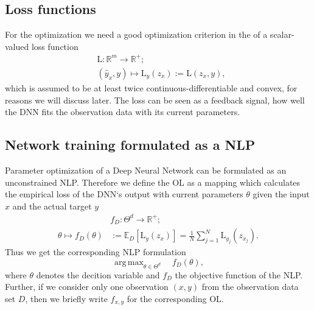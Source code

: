 \documentclass[conference]{IEEEtran}
\DeclareMathOperator*{\argmax}{arg\,max}
\begin{document}
\subsection{Loss functions}
For the optimization we need a good optimization criterion in the of a scalar-valued loss function
\begin{align*}
&\mathrm{L}:\mathbb{R}^{m}\rightarrow \mathbb{R}^{+};\\
&(\hat{y}_{x}, y)\mapsto \mathrm{L}_{y}(z_{x}) := \mathrm{L}(z_{x}, y),
\end{align*}
which is assumed to be at least twice continuous-differentiable and convex, for reasons we will discuss later. The loss can be seen as a feedback signal, how well the DNN fits the observation data with its current parameters.

\subsection{Network training formulated as a NLP}
Parameter optimization of a Deep Neural Network can be formulated as an unconstrained NLP. Therefore we define the OL as a mapping which calculates the empirical loss of the DNN`s output with current parameters $\theta$ given the input $x$ and the actual target $y$
\begin{align*}
&f_{D}:\Theta^{d}\rightarrow\mathbb{R}^{+};\\
\theta\mapsto f_{D}(\theta) &:= \mathbb{E}_{D}[\mathrm{L}_{y}(z_{x})] =  \frac{1}{N}\sum_{j = 1}^{N}\mathrm{L}_{y_{j}}(z_{x_{j}}).
\end{align*}
Thus we get the corresponding NLP formulation
$$\argmax_{\theta\in\Theta^{d}}\quad f_{D}(\theta),$$
where $\theta$ denotes the decition variable and $f_{D}$ the objective function of the NLP.
Further, if we consider only one observation $(x, y)$ from the observation data set $D$, then we briefly write  $f_{x, y}$ for the corresponding OL.
\end{document}
